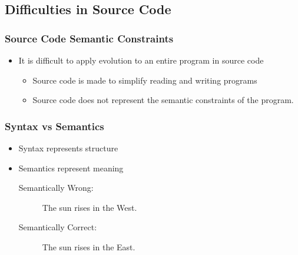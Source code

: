 \documentclass{beamer}
\begin{document}
\subsection{Difficulties in Source Code}
\begin{frame}
	\frametitle{Source Code Semantic Constraints}
	\begin{itemize}
		\item It is difficult to apply evolution to an entire program in source code
			\\
		\begin{itemize}
			\item Source code is made to simplify reading and writing programs
			\item Source code does not represent the semantic constraints of the program.
		\end{itemize}
	\end{itemize}	
\end{frame}

\begin{frame}
	\frametitle{Syntax vs Semantics}
\begin{itemize}
\item Syntax represents structure
\item Semantics represent meaning
	\\
\begin{description}

\item[Semantically Wrong:] The sun rises in the West.  
\item[Semantically Correct:] The sun rises in the East.
\end{description}
\end{itemize}

\end{frame}
\end{document}
